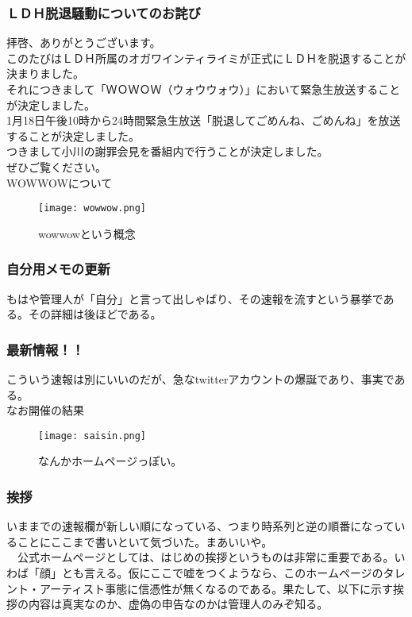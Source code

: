 \subsubsection{ＬＤＨ脱退騒動についてのお詫び}
拝啓、ありがとうございます。 \\
このたびはＬＤＨ所属のオガワインティライミが正式にＬＤＨを脱退することが決まりました。 \\
それにつきまして「ＷＯＷＯＷ（ウォウウォウ）」において緊急生放送することが決定しました。\\ 
1月18日午後10時から24時間緊急生放送「脱退してごめんね、ごめんね」を放送することが決定しました。\\ 
つきまして小川の謝罪会見を番組内で行うことが決定しました。 \\
ぜひご覧ください。\\
WOWWOWについて\\

\begin{figure}[H]
  \centering
  \texttt{[image: wowwow.png]}
  \caption{wowwowという概念}
\label{wowwow}
\end{figure}

\subsubsection{自分用メモの更新}
もはや管理人が「自分」と言って出しゃばり、その速報を流すという暴挙である。その詳細は後ほどである。

\subsubsection{最新情報！！}
こういう速報は別にいいのだが、急なtwitterアカウントの爆誕であり、事実である。\\
なお開催の結果\\

\begin{figure}[H]
  \centering
  \texttt{[image: saisin.png]}
  \caption{なんかホームページっぽい。}
\label{saisin}
\end{figure}


\subsubsection{挨拶}
いままでの速報欄が新しい順になっている、つまり時系列と逆の順番になっていることにここまで書いといて気づいた。まあいいや。\\
　公式ホームページとしては、はじめの挨拶というものは非常に重要である。いわば「顔」とも言える。仮にここで嘘をつくようなら、このホームページのタレント・アーティスト事態に信憑性が無くなるのである。果たして、以下に示す挨拶の内容は真実なのか、虚偽の申告なのかは管理人のみぞ知る。\\


